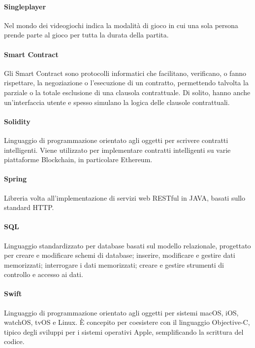 \documentclass[]{article}
\begin{document}
	\paragraph*{Singleplayer}
	Nel mondo dei videogiochi indica la modalità di gioco in cui una sola persona prende parte al gioco per tutta la durata della partita.
	
	\paragraph*{Smart Contract}
	Gli Smart Contract sono protocolli informatici che facilitano, verificano, o fanno rispettare, la negoziazione o l'esecuzione di un contratto, permettendo talvolta la parziale o la totale esclusione di una clausola contrattuale. Di solito, hanno anche un'interfaccia utente e spesso simulano la logica delle clausole contrattuali.
	
	\paragraph*{Solidity}
	Linguaggio di programmazione orientato agli oggetti per scrivere contratti intelligenti. Viene utilizzato per implementare contratti intelligenti su varie piattaforme Blockchain, in particolare Ethereum.
	
	\paragraph*{Spring}
	Libreria volta all'implementazione di servizi web RESTful in JAVA, basati sullo standard HTTP.
	
	\paragraph*{SQL}
	Linguaggio standardizzato per database basati sul modello relazionale, progettato per creare e modificare schemi di database; inserire, modificare e gestire dati memorizzati; interrogare i dati memorizzati; creare e gestire strumenti di controllo e accesso ai dati.
	
	\paragraph*{Swift}
	Linguaggio di programmazione orientato agli oggetti per sistemi macOS, iOS, watchOS, tvOS e Linux. È concepito per coesistere con il linguaggio Objective-C, tipico degli sviluppi per i sistemi operativi Apple, semplificando la scrittura del codice.
	
\end{document}
